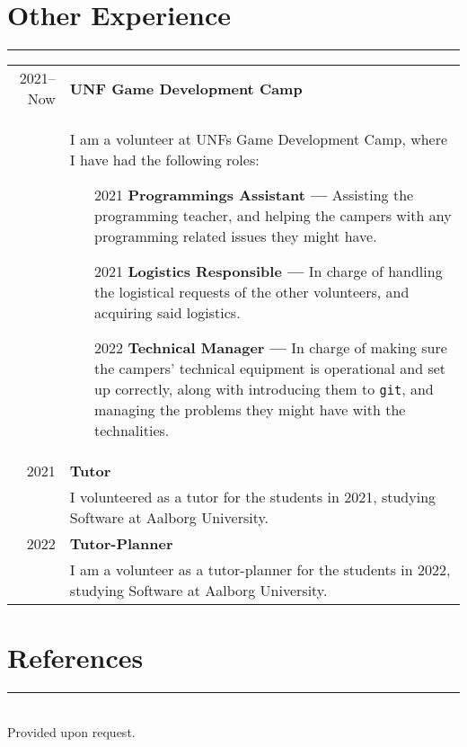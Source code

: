 \documentclass{article}
\begin{document}
\section*{Other Experience}
\hrule width5cm
\begin{longtabu} to \textwidth {r|X}
2021--Now & \textbf{UNF Game Development Camp}\\
&   I am a volunteer at UNFs Game Development Camp, where I have had the following roles:
    \begin{itemize}\setlength\itemsep{0em}
        \item[2021] \textbf{Programmings Assistant ---} Assisting the programming teacher, and
            helping the campers with any programming related issues they might have.
        \item[2021] \textbf{Logistics Responsible ---} In charge of handling the logistical
            requests of the other volunteers, and acquiring said logistics.
        \item[2022] \textbf{Technical Manager ---} In charge of making sure the campers'
            technical equipment is operational and set up correctly,
            along with introducing them to \texttt{git}, and managing
            the problems they might have with the technalities.
    \end{itemize}
    \\
2021 & \textbf{Tutor}\\
&   I volunteered as a tutor for the students in 2021, studying Software at Aalborg University.\\
2022 & \textbf{Tutor-Planner}\\
&   I am a volunteer as a tutor-planner for the students in 2022, studying Software at Aalborg University.
\end{longtabu}

\section*{References}
\hrule width5cm \ \\
Provided upon request.
\end{document}
